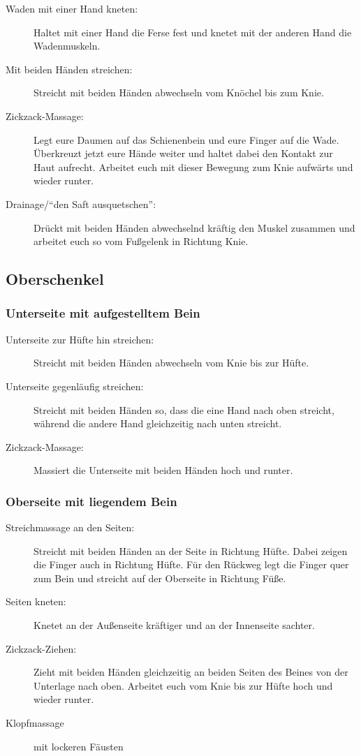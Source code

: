\begin{description}
  \item [Waden mit einer Hand kneten:] Haltet mit einer Hand die Ferse fest und knetet mit der anderen Hand die Wadenmuskeln.
  \item [Mit beiden Händen streichen:] Streicht mit beiden Händen abwechseln vom Knöchel bis zum Knie.
  \item [Zickzack-Massage:] Legt eure Daumen auf das Schienenbein und eure Finger auf die Wade. Überkreuzt jetzt eure Hände weiter und haltet dabei den Kontakt zur Haut aufrecht. Arbeitet euch mit dieser Bewegung zum Knie aufwärts und wieder runter.
  \item [Drainage/"`den Saft ausquetschen"':] Drückt mit beiden Händen abwechselnd kräftig den Muskel zusammen und arbeitet euch so vom Fußgelenk in Richtung Knie.
\end{description}

\subsection{Oberschenkel}

\subsubsection{Unterseite mit aufgestelltem Bein}

\begin{description}
  \item [Unterseite zur Hüfte hin streichen:] Streicht mit beiden Händen abwechseln vom Knie bis zur Hüfte.
  \item [Unterseite gegenläufig streichen:] Streicht mit beiden Händen so, dass die eine Hand nach oben streicht, während die andere Hand gleichzeitig nach unten streicht.
  \item [Zickzack-Massage:] Massiert die Unterseite mit beiden Händen hoch und runter.
\end{description}

\subsubsection{Oberseite mit liegendem Bein}

\begin{description}
  \item [Streichmassage an den Seiten:] Streicht mit beiden Händen an der Seite in Richtung Hüfte. Dabei zeigen die Finger auch in Richtung Hüfte. Für den Rückweg legt die Finger quer zum Bein und streicht auf der Oberseite in Richtung Füße.
  \item [Seiten kneten:] Knetet an der Außenseite kräftiger und an der Innenseite sachter.
  \item [Zickzack-Ziehen:] Zieht mit beiden Händen gleichzeitig an beiden Seiten des Beines von der Unterlage nach oben. Arbeitet euch vom Knie bis zur Hüfte hoch und wieder runter.
  \item [Klopfmassage] mit lockeren Fäusten
\end{description}


